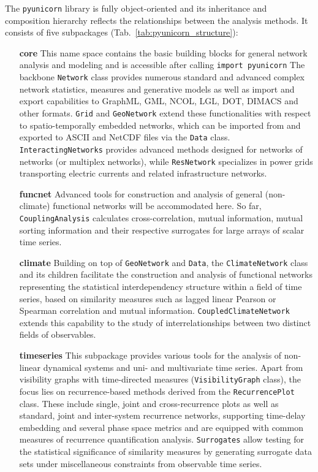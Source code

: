 The \texttt{pyunicorn} library is fully object-oriented and its inheritance and composition hierarchy reflects the relationships between the analysis methods. It consists of five subpackages (Tab.~\ref{tab:pyunicorn_structure}):
\begin{enumerate}
\item[\bf{core}] This name space contains the basic building blocks for general network analysis and modeling and is accessible after calling \texttt{import pyunicorn} %
The backbone \texttt{Network} class provides numerous standard and advanced complex network statistics, measures and generative models as well as import and export capabilities to GraphML, GML, NCOL, LGL, DOT, DIMACS and other formats. \texttt{Grid} and \texttt{GeoNetwork} extend these functionalities with respect to spatio-temporally embedded networks, which can be imported from and exported to ASCII and NetCDF files via the \texttt{Data} class. \texttt{InteractingNetworks} provides advanced methods designed for networks of networks (or multiplex networks), while \texttt{ResNetwork} specializes in power grids transporting electric currents and related infrastructure networks.

\item[\bf{funcnet}] Advanced tools for construction and analysis of general (non-climate) functional networks will be accommodated here. So far, \texttt{CouplingAnalysis} calculates cross-correlation, mutual information, mutual sorting information and their respective surrogates for large arrays of scalar time series.%

\item[\bf{climate}] Building on top of \texttt{GeoNetwork} and \texttt{Data}, the \texttt{ClimateNetwork} class and its children facilitate the construction and analysis of functional networks representing the statistical interdependency structure within a field of time series, based on similarity measures such as lagged linear Pearson or Spearman correlation and mutual information. %
\texttt{CoupledClimateNetwork} extends this capability to the study of interrelationships between two distinct fields of observables.%

\item[\bf{timeseries}] This subpackage provides various tools for the analysis of non-linear dynamical systems and uni- and multivariate time series.%
Apart from visibility graphs with time-directed measures (\texttt{VisibilityGraph} class), the focus lies on recurrence-based methods derived from the \texttt{RecurrencePlot} class. These include single, joint and cross-recurrence plots as well as standard, joint and inter-system recurrence networks, supporting time-delay embedding and several phase space metrics and are equipped with common measures of recurrence quantification analysis. \texttt{Surrogates} allow testing for the statistical significance of similarity measures by generating surrogate data sets under miscellaneous constraints from observable time series. %


\end{enumerate}
